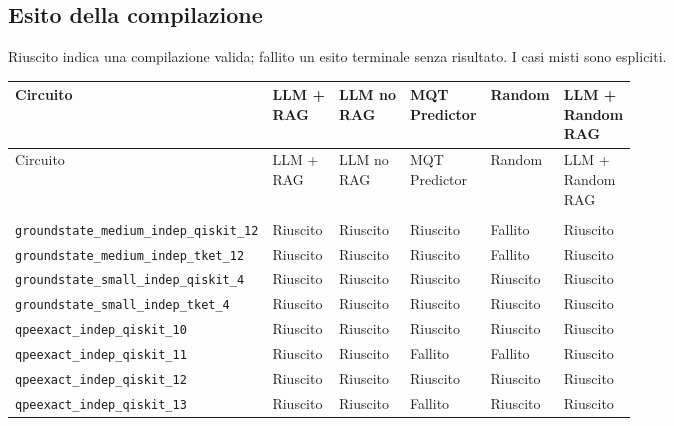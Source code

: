 \subsection{Esito della compilazione}
Riuscito indica una compilazione valida; fallito un esito terminale senza risultato. I casi misti sono espliciti.
\begingroup\small
\setlength{\tabcolsep}{5pt}
\begin{longtable}{>{\raggedright\arraybackslash}p{6.0cm}>{\centering\arraybackslash}p{1.75cm}>{\centering\arraybackslash}p{1.75cm}>{\centering\arraybackslash}p{1.75cm}>{\centering\arraybackslash}p{1.75cm}>{\centering\arraybackslash}p{1.75cm}}
\toprule
Circuito & \shortstack{LLM +\\RAG} & \shortstack{LLM no\\RAG} & \shortstack{MQT\\Predictor} & Random & \shortstack{LLM +\\Random\\RAG} \\
\midrule
\endfirsthead
\toprule
Circuito & \shortstack{LLM +\\RAG} & \shortstack{LLM no\\RAG} & \shortstack{MQT\\Predictor} & Random & \shortstack{LLM +\\Random\\RAG} \\
\midrule\endhead
\midrule\multicolumn{6}{r}{\footnotesize Segue nella pagina successiva}\\
\endfoot
\bottomrule\endlastfoot
\nolinkurl{groundstate_medium_indep_qiskit_12} & Riuscito & Riuscito & Riuscito & Fallito & Riuscito \\
\nolinkurl{groundstate_medium_indep_tket_12} & Riuscito & Riuscito & Riuscito & Fallito & Riuscito \\
\nolinkurl{groundstate_small_indep_qiskit_4} & Riuscito & Riuscito & Riuscito & Riuscito & Riuscito \\
\nolinkurl{groundstate_small_indep_tket_4} & Riuscito & Riuscito & Riuscito & Riuscito & Riuscito \\
\nolinkurl{qpeexact_indep_qiskit_10} & Riuscito & Riuscito & Riuscito & Riuscito & Riuscito \\
\nolinkurl{qpeexact_indep_qiskit_11} & Riuscito & Riuscito & Fallito & Fallito & Riuscito \\
\nolinkurl{qpeexact_indep_qiskit_12} & Riuscito & Riuscito & Riuscito & Riuscito & Riuscito \\
\nolinkurl{qpeexact_indep_qiskit_13} & Riuscito & Riuscito & Fallito & Riuscito & Riuscito \\

\end{longtable}

